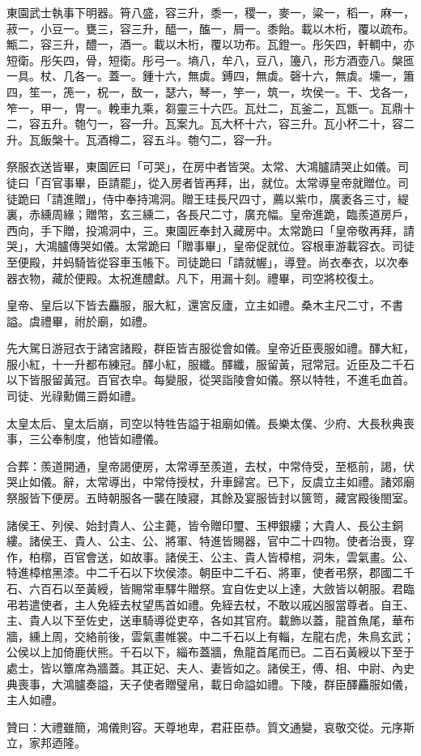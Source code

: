 \begin{pinyinscope}
東園武士執事下明器。筲八盛，容三升，黍一，稷一，麥一，粱一，稻一，麻一，菽一，小豆一。甕三，容三升，醯一，醢一，屑一。黍飴。載以木桁，覆以疏布。甒二，容三升，醴一，酒一。載以木桁，覆以功布。瓦鐙一。彤矢四，軒輖中，亦短衛。彤矢四，骨，短衛。彤弓一。墒八，牟八，豆八，籩八，形方酒壺八。槃匜一具。杖、几各一。蓋一。鍾十六，無虡。鎛四，無虡。磬十六，無虡。壎一，簫四，笙一，箎一，柷一，敔一，瑟六，琴一，竽一，筑一，坎侯一。干、戈各一，笮一，甲一，冑一。輓車九乘，芻靈三十六匹。瓦灶二，瓦釜二，瓦甑一。瓦鼎十二，容五升。匏勺一，容一升。瓦案九。瓦大杯十六，容三升。瓦小杯二十，容二升。瓦飯槃十。瓦酒樽二，容五斗。匏勺二，容一升。

祭服衣送皆畢，東園匠曰「可哭」，在房中者皆哭。太常、大鴻臚請哭止如儀。司徒曰「百官事畢，臣請罷」，從入房者皆再拜，出，就位。太常導皇帝就贈位。司徒跪曰「請進贈」，侍中奉持鴻洞。贈王珪長尺四寸，薦以紫巾，廣袤各三寸，緹裏，赤纁周緣；贈幣，玄三纁二，各長尺二寸，廣充幅。皇帝進跪，臨羨道房戶，西向，手下贈，投鴻洞中，三。東園匠奉封入藏房中。太常跪曰「皇帝敬再拜，請哭」，大鴻臚傳哭如儀。太常跪曰「贈事畢」，皇帝促就位。容根車游載容衣。司徒至便殿，并蚂騎皆從容車玉帳下。司徒跪曰「請就幄」，導登。尚衣奉衣，以次奉器衣物，藏於便殿。太祝進醴獻。凡下，用漏十刻。禮畢，司空將校復土。

皇帝、皇后以下皆去麤服，服大紅，還宮反廬，立主如禮。桑木主尺二寸，不書謚。虞禮畢，祔於廟，如禮。

先大駕日游冠衣于諸宮諸殿，群臣皆吉服從會如儀。皇帝近臣喪服如禮。醳大紅，服小紅，十一升都布練冠。醳小紅，服纖。醳纖，服留黃，冠常冠。近臣及二千石以下皆服留黃冠。百官衣皁。每變服，從哭詣陵會如儀。祭以特牲，不進毛血首。司徒、光祿勳備三爵如禮。

太皇太后、皇太后崩，司空以特牲告謚于祖廟如儀。長樂太僕、少府、大長秋典喪事，三公奉制度，他皆如禮儀。

合葬：羨道開通，皇帝謁便房，太常導至羨道，去杖，中常侍受，至柩前，謁，伏哭止如儀。辭，太常導出，中常侍授杖，升車歸宮。已下，反虞立主如禮。諸郊廟祭服皆下便房。五時朝服各一襲在陵寢，其餘及宴服皆封以篋笥，藏宮殿後閤室。

諸侯王、列侯、始封貴人、公主薨，皆令贈印璽、玉柙銀縷；大貴人、長公主銅縷。諸侯王、貴人、公主、公、將軍、特進皆賜器，官中二十四物。使者治喪，穿作，柏槨，百官會送，如故事。諸侯王、公主、貴人皆樟棺，洞朱，雲氣畫。公、特進樟棺黑漆。中二千石以下坎侯漆。朝臣中二千石、將軍，使者弔祭，郡國二千石、六百石以至黃綬，皆賜常車驛牛贈祭。宜自佐史以上達，大斂皆以朝服。君臨弔若遣使者，主人免絰去杖望馬首如禮。免絰去杖，不敢以戚凶服當尊者。自王、主、貴人以下至佐史，送車騎導從吏卒，各如其官府。載飾以蓋，龍首魚尾，華布牆，纁上周，交絡前後，雲氣畫帷裳。中二千石以上有輜，左龍右虎，朱鳥玄武；公侯以上加倚鹿伏熊。千石以下，緇布蓋牆，魚龍首尾而已。二百石黃綬以下至于處士，皆以簟席為牆蓋。其正妃、夫人、妻皆如之。諸侯王，傅、相、中尉、內史典喪事，大鴻臚奏謚，天子使者贈璧帛，載日命謚如禮。下陵，群臣醳麤服如儀，主人如禮。

贊曰：大禮雖簡，鴻儀則容。天尊地卑，君莊臣恭。質文通變，哀敬交從。元序斯立，家邦迺隆。


\end{pinyinscope}